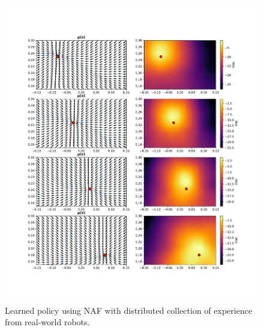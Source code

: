 \begin{figure}[h]
    \centering
    \includegraphics[width=\textwidth]{res/multiple_goals_uarm.pdf}

    \caption{Learned policy using NAF with distributed collection of experience
    from real-world robots.}

    \label{fig:uarm_moving_goal_policy}
    
\end{figure}

%
%    

